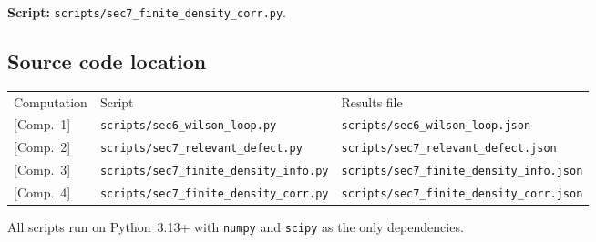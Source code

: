 \documentclass[
  aps,
  prd,
  preprint,
  groupedaddress,
  nofootinbib,
  longbibliography
]{revtex4-2}
\theoremstyle{remark}
\begin{document}
\noindent\textbf{Script:}
\texttt{scripts/sec7\_finite\_density\_corr.py}.

\subsection*{Source code location}

\begin{table}[h]
\begin{ruledtabular}
\begin{tabular}{lll}
Computation & Script & Results file \\
\colrule
{[Comp.~1]} & \texttt{scripts/sec6\_wilson\_loop.py}
  & \texttt{scripts/sec6\_wilson\_loop.json} \\
{[Comp.~2]} & \texttt{scripts/sec7\_relevant\_defect.py}
  & \texttt{scripts/sec7\_relevant\_defect.json} \\
{[Comp.~3]} & \texttt{scripts/sec7\_finite\_density\_info.py}
  & \texttt{scripts/sec7\_finite\_density\_info.json} \\
{[Comp.~4]} & \texttt{scripts/sec7\_finite\_density\_corr.py}
  & \texttt{scripts/sec7\_finite\_density\_corr.json} \\
\end{tabular}
\end{ruledtabular}
\end{table}

\noindent
All scripts run on Python~3.13+ with \texttt{numpy} and
\texttt{scipy} as the only dependencies.
\end{document}
